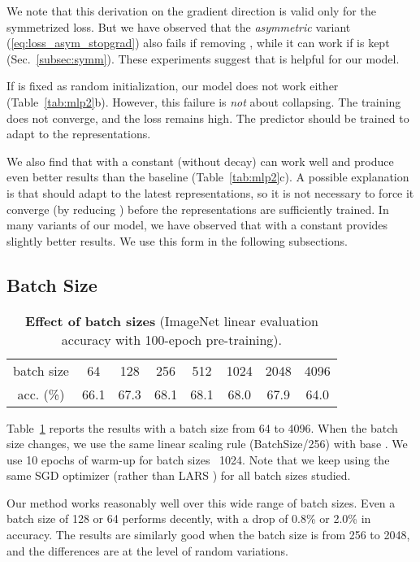 \documentclass[final]{cvpr}
\newcommand{\tablestyle}[2]{\setlength{\tabcolsep}{#1}\renewcommand{\arraystretch}{#2}\centering\footnotesize}
\begin{document}
We note that this derivation on the gradient direction is valid only for the symmetrized loss. But we have observed that the \emph{asymmetric} variant (\ref{eq:loss_asym_stopgrad}) also fails if removing ,  while it can work if  is kept (Sec.~\ref{subsec:symm}).
These experiments suggest that  is helpful for our model.

If  is fixed as random initialization, our model does not work either (Table~\ref{tab:mlp2}b).
However, this failure is \emph{not} about collapsing. 
The training does not converge, and the loss remains high.
The predictor  should be trained to adapt to the representations. 

We also find that  with a constant  (without decay) can work well and produce even better results than the baseline (Table~\ref{tab:mlp2}c). A possible explanation is that  should adapt to the latest representations, so it is not necessary to force it converge (by reducing ) before the representations are sufficiently trained. In many variants of our model, we have observed that  with a constant  provides slightly better results. We use this form in the following subsections.

\subsection{Batch Size} \label{subsec:batch}
 
\begin{table}[t]
\centering
\small
\tablestyle{6pt}{1.1}
\begin{tabular}{c|ccccccc}
batch size & 64 & 128 & 256 & 512 & 1024 & 2048 & 4096 \\
\shline
acc. (\%) & 66.1 & 67.3 & 68.1 & 68.1 & 68.0 & 67.9 & 64.0 \\ 
\end{tabular}
\vspace{.5em}
\caption{\textbf{Effect of batch sizes} (ImageNet linear evaluation accuracy with 100-epoch pre-training).
\label{tab:batch}
}
\end{table}


Table~\ref{tab:batch} reports the results with a batch size from 64 to 4096. When the batch size changes, we use the same linear scaling rule (BatchSize/256) \cite{Goyal2017} with base .
We use 10 epochs of warm-up \cite{Goyal2017} for batch sizes ~1024. Note that we keep using the same SGD optimizer (rather than LARS \cite{You2017}) for all batch sizes studied.

Our method works reasonably well over this wide range of batch sizes. Even a batch size of 128 or 64 performs decently, with a drop of 0.8\% or 2.0\% in accuracy.
The results are similarly good when the batch size is from 256 to 2048, and the differences are at the level of random variations.
\end{document}
